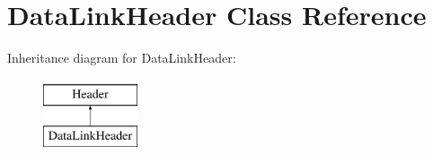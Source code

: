 \hypertarget{class_data_link_header}{\section{Data\-Link\-Header Class Reference}
\label{class_data_link_header}
}
Inheritance diagram for Data\-Link\-Header\-:\begin{figure}[H]
\begin{center}
\leavevmode
\includegraphics[height=2.000000cm]{class_data_link_header}
\end{center}
\end{figure}

